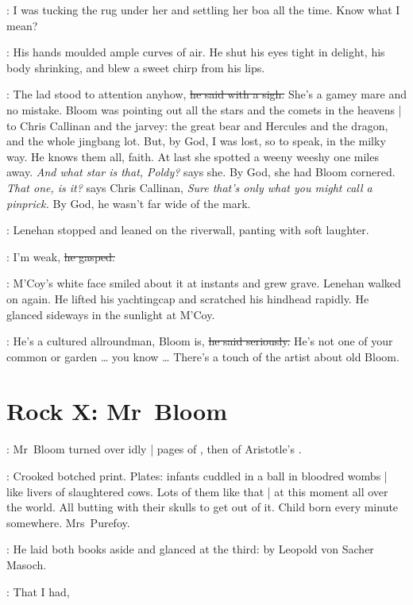 \lenehan:
I was tucking the rug under her
and settling her boa all the time.
Know what I mean?

:
His hands moulded ample curves of air.
He shut his eyes tight in delight,
his body shrinking,
and blew a sweet chirp from his lips.

\lenehan:
The lad stood to attention anyhow,
\sout{he said with a sigh.}
She's a gamey mare and no mistake.
Bloom was pointing out all the stars and the comets in the heavens |
to Chris Callinan and the jarvey:
the great bear and Hercules and the dragon,
and the whole jingbang lot.
But, by God, I was lost,
so to speak,
in the milky way.%
He knows them all, faith.
At last she spotted a weeny weeshy one miles away.
\emph{And what star is that, Poldy?}
says she.
By God, she had Bloom cornered.
\emph{That one, is it?}
says Chris Callinan,
\emph{Sure that's only what you might call a pinprick.}
By God, he wasn't far wide of the mark.

:
Lenehan stopped and leaned on the riverwall,
panting with soft laughter.

\lenehan:
I'm weak,
\sout{he gasped.}

:
M'Coy's white face smiled about it at instants and grew grave.
Lenehan walked on again.
He lifted his yachtingcap and scratched his hindhead rapidly.%
He glanced sideways in the sunlight at M'Coy.

\lenehan:
He's a cultured allroundman,
Bloom is,
\sout{he said seriously.}
He's not one of your common or garden \ldots
you know \ldots
There's a touch of the artist about old Bloom.


\section*{Rock X: Mr~Bloom}


:
Mr~Bloom turned over idly |
pages of ,
then of Aristotle's .

\BloomInt:
Crooked botched print.
Plates:
infants cuddled in a ball in bloodred wombs |
like livers of slaughtered cows.
Lots of them like that |
at this moment all over the world.
All butting with their skulls to get out of it.
Child born every minute somewhere.
Mrs~Purefoy.%

:
He laid both books aside and glanced at the third:
by Leopold von Sacher Masoch.

\Bloom:
That I had,

